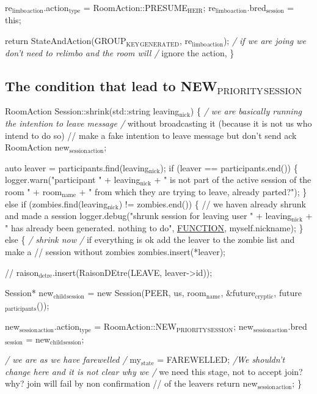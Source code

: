 \documentclass[11pt]{article}
\begin{document}
re$_{\text{limbo}}$$_{\text{action}}$.action$_{\text{type}}$ = RoomAction::PRESUME$_{\text{HEIR}}$;
re$_{\text{limbo}}$$_{\text{action}}$.bred$_{\text{session}}$ = this;

    return StateAndAction(GROUP$_{\text{KEY}}$$_{\text{GENERATED}}$, re$_{\text{limbo}}$$_{\text{action}}$);
    \emph{/ if we are joing we don't need to relimbo and the room will
    /} ignore the action,
\}

\subsection{The condition that lead to NEW$_{\text{PRIORITY}}$$_{\text{SESSION}}$}
\label{sec-1-3}
RoomAction Session::shrink(std::string leaving$_{\text{nick}}$)
\{
 \emph{/ we are basically running the intention to leave message
 /} without broadcasting it (because it is not us who intend to do so)
 // make a fake intention to leave message but don't send ack
 RoomAction new$_{\text{session}}$$_{\text{action}}$;

auto leaver = participants.find(leaving$_{\text{nick}}$);
if (leaver == participants.end()) \{
    logger.warn("participant " + leaving$_{\text{nick}}$ + " is not part of the active session of the room " + room$_{\text{name}}$ +
                " from which they are trying to leave, already parted?");
\} else if (zombies.find(leaving$_{\text{nick}}$) != zombies.end()) \{ // we haven already shrunk and made a session
    logger.debug("shrunk session for leaving user " + leaving$_{\text{nick}}$ + " has already been generated. nothing to do",
                 \uline{\uline{FUNCTION}}, myself.nickname);
\} else \{ \emph{/ shrink now
    /} if everything is ok add the leaver to the zombie list and make a
    // session without zombies
    zombies.insert(*leaver);

// raison$_{\text{detre}}$.insert(RaisonDEtre(LEAVE, leaver->id));

Session* new$_{\text{child}}$$_{\text{session}}$ =
    new Session(PEER, us, room$_{\text{name}}$, \&future$_{\text{cryptic}}$, future$_{\text{participants}}$());

new$_{\text{session}}$$_{\text{action}}$.action$_{\text{type}}$ = RoomAction::NEW$_{\text{PRIORITY}}$$_{\text{SESSION}}$;
new$_{\text{session}}$$_{\text{action}}$.bred$_{\text{session}}$ = new$_{\text{child}}$$_{\text{session}}$;

    \emph{/ we are as we have farewelled
    /} my$_{\text{state}}$ = FAREWELLED; \emph{/We shouldn't change here and it is not clear why we
    /} we need this stage, not to accept join? why? join will fail by non confirmation
    // of the leavers
    return new$_{\text{session}}$$_{\text{action}}$;
\}
\end{document}
